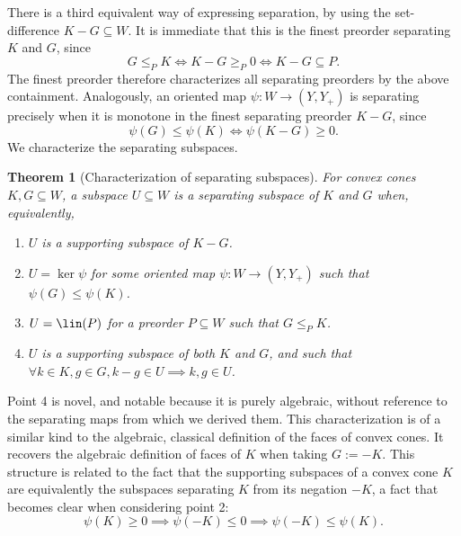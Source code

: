 \documentclass{article}
\theoremstyle{plain}
\newtheorem{theorem}{Theorem}[section]
\theoremstyle{definition}
\theoremstyle{remark}
\begin{document}
There is a third equivalent way of expressing separation, by
using the set-difference $K-G \subseteq W$. It is immediate that this is the finest preorder
separating $K$ and $G$, since
\begin{equation*}
G \le_{P} K \iff K-G \ge_{P} 0  \iff K - G \subseteq P.
\end{equation*}
The finest preorder therefore characterizes all separating preorders by the above containment.
Analogously, an oriented map $\psi:W \to (Y,Y_+)$ is separating
precisely when it is monotone in the finest separating preorder $K-G$, since
\begin{equation*}
\psi(G) \leq \psi(K)  \iff \psi(K-G) \geq 0.
\end{equation*}
We characterize the separating subspaces.
\begin{theorem}[Characterization of separating subspaces]
\label{loc:characterization_of_separating_subspaces.statement}
For convex cones $K, G \subseteq W$, a subspace $U \subseteq W$ is a separating subspace of $K$ and $G$ when, equivalently, 
\begin{enumerate}
\item $U$ is a supporting subspace of $K-G$.
\item $U = \ker \psi$ for some oriented map $\psi:W \to (Y, Y_+)$ such that $\psi(G)\le \psi(K)$.
\item $U = \lin(P)$ for a preorder $P \subseteq W$ such that $G \le_{P} K$.
\item $U$ is a supporting subspace of both $K$ and $G$, and such that $\forall k  \in K, g  \in G, k-g \in U \implies k, g \in U$.
\end{enumerate}
\end{theorem}
Point 4 is novel, and notable because it is purely algebraic, without reference to the separating maps from which we derived them. This characterization is of a similar kind to the algebraic, classical definition of the faces of convex cones. It recovers the algebraic definition of faces of $K$ when taking $G := -K$. 
This structure is related to the fact that the supporting subspaces of a convex cone $K$ are equivalently the subspaces separating $K$ from its negation $-K$, a fact that becomes clear when considering point 2: 
\begin{equation*}
\psi(K) \geq 0  \implies \psi(-K) \leq 0  \implies \psi(-K) \leq \psi(K).
\end{equation*}
\end{document}
